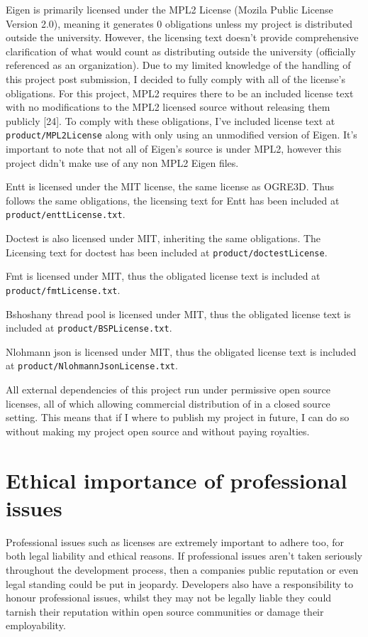 \documentclass[]{final_report}
\begin{document}
Eigen is primarily licensed under the MPL2 License (Mozila Public License Version 2.0), meaning it generates 0 obligations unless my project is distributed outside the university. However, the licensing text doesn't provide comprehensive clarification of what would count as distributing outside the university (officially referenced as an organization). Due to my limited knowledge of the handling of this project post submission, I decided to fully comply with all of the license's obligations. For this project, MPL2 requires there to be an included license text with no modifications to the MPL2 licensed source without releasing them publicly [24]. To comply with these obligations, I've included license text at \texttt{product/MPL2License} along with only using an unmodified version of Eigen. It's important to note that not all of Eigen's source is under MPL2, however this project didn't make use of any non MPL2 Eigen files.

Entt is licensed under the MIT license, the same license as OGRE3D. Thus follows the same obligations, the licensing text for Entt has been included at \texttt{product/enttLicense.txt}.

Doctest is also licensed under MIT, inheriting the same obligations. The Licensing text for doctest has been included at \texttt{product/doctestLicense}.

Fmt is licensed under MIT, thus the obligated license text is included at \texttt{product/fmtLicense.txt}.

Bshoshany thread pool is licensed under MIT, thus the obligated license text is included at \texttt{product/BSPLicense.txt}.

Nlohmann json is licensed under MIT, thus the obligated license text is included at \newline \texttt{product/NlohmannJsonLicense.txt}.

All external dependencies of this project run under permissive open source licenses, all of which allowing commercial distribution of in a closed source setting. This means that if I where to publish my project in future, I can do so without making my project open source and without paying royalties. 


\section {Ethical importance of professional issues}

Professional issues such as licenses are extremely important to adhere too, for both legal liability and ethical reasons. If professional issues aren't taken seriously throughout the development process, then a companies public reputation or even legal standing could be put in jeopardy. Developers also have a responsibility to honour professional issues, whilst they may not be legally liable they could tarnish their reputation within open source communities or damage their employability.
\end{document}
